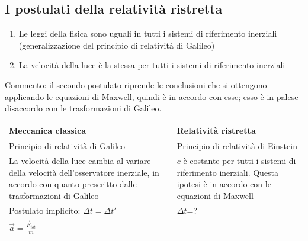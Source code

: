     \subsection{I postulati della relatività ristretta}
        \begin{enumerate}
            \item Le leggi della fisica sono uguali in tutti i sistemi di riferimento inerziali (generalizzazione del principio di relatività di Galileo)
            \item La velocità della luce è la stessa per tutti i sistemi di riferimento inerziali
        \end{enumerate}
        \par Commento: il secondo postulato riprende le conclusioni che si ottengono applicando le equazioni di Maxwell, quindi è in accordo con esse; esso è in palese disaccordo con le trasformazioni di Galileo.
        \par
        \begin{tabular}{p{7.5cm}|p{7.5cm}}
        \textbf{Meccanica classica}                                                                                                    & \textbf{Relatività ristretta}                                                                   \\ \hline
        Principio di relatività di Galileo                                                                                                                   & Principio di relatività di Einstein                                                                                  \\
        La velocità della luce cambia al variare della velocità dell'osservatore inerziale, in accordo con quanto prescritto dalle trasformazioni di Galileo & $c$ è costante per tutti i sistemi di riferimento inerziali. Questa ipotesi è in accordo con le equazioni di Maxwell \\
        Postulato implicito: ${\Delta}t={\Delta}t'$                                                                                                          & ${\Delta}t$=?                                                                                                        \\
        $\vec{a}=\frac{\vec{F}_{tot}}{m}$                                                            &                                                                                                                     
        \end{tabular}
